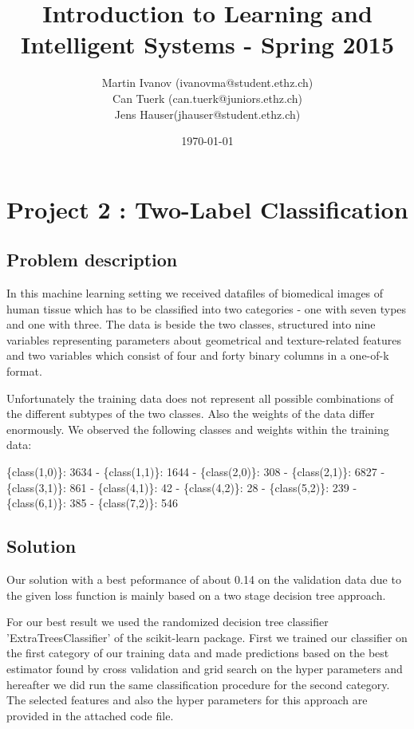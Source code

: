 \documentclass[a4paper, 11pt]{article}
\title{Introduction to Learning and Intelligent Systems - Spring 2015}
\author{Martin Ivanov (ivanovma@student.ethz.ch)\\ Can Tuerk (can.tuerk@juniors.ethz.ch)\\ Jens Hauser(jhauser@student.ethz.ch)\\}
\date{\today}
\begin{document}
\maketitle

\section*{Project 2 : Two-Label Classification}

\subsection*{Problem description}
In this machine learning setting we received datafiles of biomedical images of human tissue which has to be classified into two categories - one with seven types and one with three. The data is beside the two classes, structured into nine variables representing parameters about geometrical and texture-related features and two variables which consist of four and forty binary columns in a one-of-k format.

Unfortunately the training data does not represent all possible combinations of the different subtypes of the two classes. Also the weights of the data differ enormously. We observed the following classes and weights within the training data:

\{class(1,0)\}: 3634 - \{class(1,1)\}: 1644 - \{class(2,0)\}: 308 - \{class(2,1)\}: 6827 - \{class(3,1)\}: 861 - \{class(4,1)\}: 42 - \{class(4,2)\}: 28 - \{class(5,2)\}: 239 - \{class(6,1)\}: 385 - \{class(7,2)\}: 546


\subsection*{Solution}
Our solution with a best peformance of about 0.14 on the validation data due to the given loss function is mainly based on a two stage decision tree approach.

For our best result we used the randomized decision tree classifier 'ExtraTreesClassifier' of the scikit-learn package. First we trained our classifier on the first category of our training data and made predictions based on the best estimator found by cross validation and grid search on the hyper parameters and hereafter we did run the same classification procedure for the second category. The selected features and also the hyper parameters for this approach are provided in the attached code file.

\newpage
\end{document}
